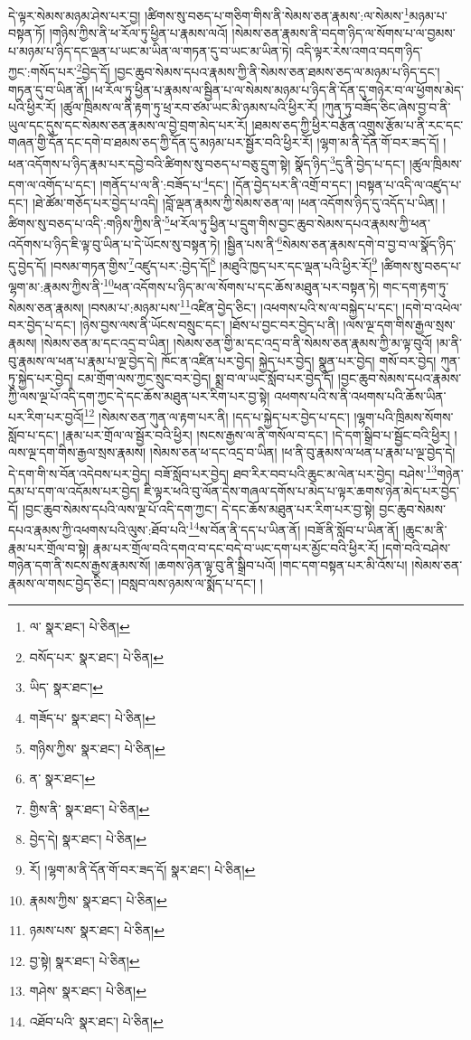 དེ་ལྟར་སེམས་མཉམ་ཤེས་པར་བྱ། །ཚིགས་སུ་བཅད་པ་གཅིག་གིས་ནི་སེམས་ཅན་རྣམས་:ལ་སེམས་\footnote{ལ་  སྣར་ཐང་།  པེ་ཅིན། }མཉམ་པ་བསྟན་ཏོ། །གཉིས་ཀྱིས་ནི་ཕ་རོལ་ཏུ་ཕྱིན་པ་རྣམས་ལའོ། །སེམས་ཅན་རྣམས་ནི་བདག་ཉིད་ལ་སོགས་པ་ལ་བྱམས་པ་མཉམ་པ་ཉིད་དང་ལྡན་པ་ཡང་མ་ཡིན་ལ་གཏན་དུ་བ་ཡང་མ་ཡིན་ཏེ། འདི་ལྟར་རེས་འགའ་བདག་ཉིད་ཀྱང་:གསོད་པར་\footnote{བསོད་པར་  སྣར་ཐང་།  པེ་ཅིན། }བྱེད་དོ། །བྱང་ཆུབ་སེམས་དཔའ་རྣམས་ཀྱི་ནི་སེམས་ཅན་ཐམས་ཅད་ལ་མཉམ་པ་ཉིད་དང་། གཏན་དུ་བ་ཡིན་ནོ། །ཕ་རོལ་ཏུ་ཕྱིན་པ་རྣམས་ལ་སྦྱིན་པ་ལ་སེམས་མཉམ་པ་ཉིད་ནི་དོན་དུ་གཉེར་བ་ལ་ཕྱོགས་མེད་པའི་ཕྱིར་རོ། །ཚུལ་ཁྲིམས་ལ་ནི་རྟག་ཏུ་ཕྲ་རབ་ཙམ་ཡང་མི་ཉམས་པའི་ཕྱིར་རོ། །ཀུན་ཏུ་བཟོད་ཅིང་ཞེས་བྱ་བ་ནི་ཡུལ་དང་དུས་དང་སེམས་ཅན་རྣམས་ལ་བྱེ་བྲག་མེད་པར་རོ། །ཐམས་ཅད་ཀྱི་ཕྱིར་བརྩོན་འགྲུས་རྩོམ་པ་ནི་རང་དང་གཞན་གྱི་དོན་དང་དགེ་བ་ཐམས་ཅད་ཀྱི་དོན་དུ་མཉམ་པར་སྦྱོར་བའི་ཕྱིར་རོ། །ལྷག་མ་ནི་དོན་གོ་བར་ཟད་དོ། །ཕན་འདོགས་པ་ཉིད་རྣམ་པར་དབྱེ་བའི་ཚིགས་སུ་བཅད་པ་བཅུ་དྲུག་སྟེ། སྣོད་ཉིད་\footnote{ཡིད་  སྣར་ཐང་། }དུ་ནི་བྱེད་པ་དང་། །ཚུལ་ཁྲིམས་དག་ལ་འགོད་པ་དང་། །གནོད་པ་ལ་ནི་:བཟོད་པ་\footnote{གཟོད་པ་  སྣར་ཐང་།  པེ་ཅིན། }དང་། །དོན་བྱེད་པར་ནི་འགྲོ་བ་དང་། །བསྟན་པ་འདི་ལ་འཛུད་པ་དང་། །ཐེ་ཚོམ་གཅོད་པར་བྱེད་པ་འདི། །བློ་ལྡན་རྣམས་ཀྱི་སེམས་ཅན་ལ། །ཕན་འདོགས་ཉིད་དུ་འདོད་པ་ཡིན། །ཚིགས་སུ་བཅད་པ་འདི་:གཉིས་ཀྱིས་ནི་\footnote{གཉིས་ཀྱིས་  སྣར་ཐང་།  པེ་ཅིན། }ཕ་རོལ་ཏུ་ཕྱིན་པ་དྲུག་གིས་བྱང་ཆུབ་སེམས་དཔའ་རྣམས་ཀྱི་ཕན་འདོགས་པ་ཉིད་ཇི་ལྟ་བུ་ཡིན་པ་དེ་ཡོངས་སུ་བསྟན་ཏེ། །སྦྱིན་པས་ནི་\footnote{ན་  སྣར་ཐང་། }སེམས་ཅན་རྣམས་དགེ་བ་བྱ་བ་ལ་སྣོད་ཉིད་དུ་བྱེད་དོ། །བསམ་གཏན་གྱིས་\footnote{གྱིས་ནི་  སྣར་ཐང་།  པེ་ཅིན། }འཛུད་པར་:བྱེད་དོ།\footnote{བྱེད་དེ།  སྣར་ཐང་།  པེ་ཅིན། } །མཐུའི་ཁྱད་པར་དང་ལྡན་པའི་ཕྱིར་རོ།\footnote{རོ། །ལྷག་མ་ནི་དོན་གོ་བར་ཟད་དོ།  སྣར་ཐང་།  པེ་ཅིན། } །ཚིགས་སུ་བཅད་པ་ལྷག་མ་:རྣམས་ཀྱིས་ནི་\footnote{རྣམས་ཀྱིས་  སྣར་ཐང་།  པེ་ཅིན། }ཕན་འདོགས་པ་ཉིད་མ་ལ་སོགས་པ་དང་ཆོས་མཐུན་པར་བསྟན་ཏེ། གང་དག་རྟག་ཏུ་སེམས་ཅན་རྣམས། །བསམ་པ་:མཉམ་པས་\footnote{ཉམས་པས་  སྣར་ཐང་།  པེ་ཅིན། }འཛིན་བྱེད་ཅིང་། །འཕགས་པའི་ས་ལ་བསྐྱེད་པ་དང་། །དགེ་བ་འཕེལ་བར་བྱེད་པ་དང་། །ཉེས་བྱས་ལས་ནི་ཡོངས་བསྲུང་དང་། །ཐོས་པ་བྱང་བར་བྱེད་པ་ནི། །ལས་ལྔ་དག་གིས་རྒྱལ་སྲས་རྣམས། །སེམས་ཅན་མ་དང་འདྲ་བ་ཡིན། །སེམས་ཅན་གྱི་མ་དང་འདྲ་བ་ནི་སེམས་ཅན་རྣམས་ཀྱི་མ་ལྟ་བུའོ། །མ་ནི་བུ་རྣམས་ལ་ཕན་པ་རྣམ་པ་ལྔ་བྱེད་དེ། ཁོང་ན་འཛིན་པར་བྱེད། སྐྱེད་པར་བྱེད། སྣུན་པར་བྱེད། གསོ་བར་བྱེད། ཀུན་ཏུ་སྐྱེད་པར་བྱེད། ངམ་གྲོག་ལས་ཀྱང་སྲུང་བར་བྱེད། སྨྲ་བ་ལ་ཡང་སློབ་པར་བྱེད་དོ། །བྱང་ཆུབ་སེམས་དཔའ་རྣམས་ཀྱི་ལས་ལྔ་པོ་འདི་དག་ཀྱང་དེ་དང་ཆོས་མཐུན་པར་རིག་པར་བྱ་སྟེ། འཕགས་པའི་ས་ནི་འཕགས་པའི་ཆོས་ཡིན་པར་རིག་པར་བྱའོ།\footnote{བྱ་སྟེ།  སྣར་ཐང་།  པེ་ཅིན། } །སེམས་ཅན་ཀུན་ལ་རྟག་པར་ནི། །དད་པ་སྐྱེད་པར་བྱེད་པ་དང་། །ལྷག་པའི་ཁྲིམས་སོགས་སློབ་པ་དང་། །རྣམ་པར་གྲོལ་ལ་སྦྱོར་བའི་ཕྱིར། །སངས་རྒྱས་ལ་ནི་གསོལ་བ་དང་། །དེ་དག་སྒྲིབ་པ་སྦྱོང་བའི་ཕྱིར། །ལས་ལྔ་དག་གིས་རྒྱལ་སྲས་རྣམས། །སེམས་ཅན་ཕ་དང་འདྲ་བ་ཡིན། །ཕ་ནི་བུ་རྣམས་ལ་ཕན་པ་རྣམ་པ་ལྔ་བྱེད་དེ། དེ་དག་གི་ས་བོན་འདེབས་པར་བྱེད། བཟོ་སློབ་པར་བྱེད། ཐབ་རིར་བབ་པའི་ཆུང་མ་ལེན་པར་བྱེད། བཤེས་\footnote{གཤེས་  སྣར་ཐང་།  པེ་ཅིན། }གཉེན་དམ་པ་དག་ལ་འདོམས་པར་བྱེད། ཇི་ལྟར་ཕའི་བུ་ལོན་དེས་གཞལ་དགོས་པ་མེད་པ་ལྟར་ཆགས་ཉེན་མེད་པར་བྱེད་དོ། །བྱང་ཆུབ་སེམས་དཔའི་ལས་ལྔ་པོ་འདི་དག་ཀྱང་། དེ་དང་ཆོས་མཐུན་པར་རིག་པར་བྱ་སྟེ། བྱང་ཆུབ་སེམས་དཔའ་རྣམས་ཀྱི་འཕགས་པའི་ལུས་:ཐོབ་པའི་\footnote{འཐོབ་པའི་  སྣར་ཐང་།  པེ་ཅིན། }ས་བོན་ནི་དད་པ་ཡིན་ནོ། །བཟོ་ནི་སློབ་པ་ཡིན་ནོ། །ཆུང་མ་ནི་རྣམ་པར་གྲོལ་བ་སྟེ། རྣམ་པར་གྲོལ་བའི་དགའ་བ་དང་བདེ་བ་ཡང་དག་པར་མྱོང་བའི་ཕྱིར་རོ། །དགེ་བའི་བཤེས་གཉེན་དག་ནི་སངས་རྒྱས་རྣམས་སོ། །ཆགས་ཉེན་ལྟ་བུ་ནི་སྒྲིབ་པའོ། །གང་དག་བསྟན་པར་མི་འོས་པ། །སེམས་ཅན་རྣམས་ལ་གསང་བྱེད་ཅིང་། །བསླབ་ལས་ཉམས་ལ་སྨོད་པ་དང་། །
